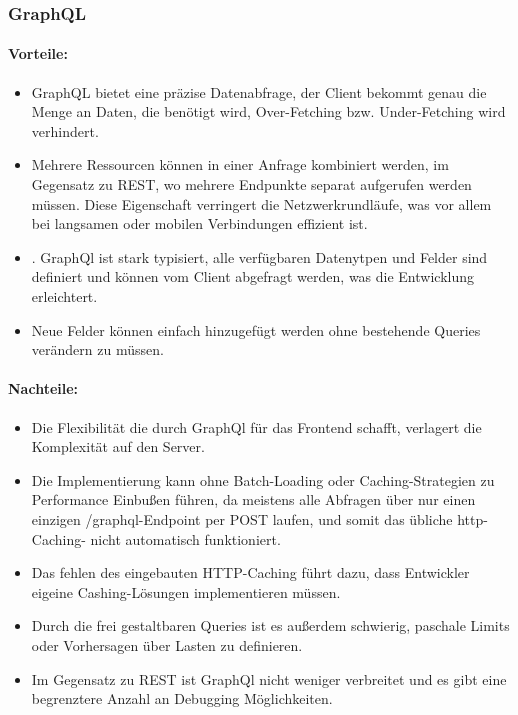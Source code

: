 \subsubsection{GraphQL}

\paragraph{Vorteile:}
\begin{itemize}
	\item GraphQL bietet eine präzise Datenabfrage, der Client bekommt genau die Menge an Daten, die benötigt wird, Over-Fetching bzw. Under-Fetching wird verhindert.
	\item Mehrere Ressourcen können in einer Anfrage kombiniert werden, im Gegensatz zu REST, wo mehrere Endpunkte separat aufgerufen werden müssen. Diese Eigenschaft verringert die Netzwerkrundläufe, was vor allem bei langsamen oder mobilen Verbindungen effizient ist.
	\item . GraphQl ist stark typisiert, alle verfügbaren Datenytpen und Felder sind definiert und können vom Client abgefragt werden, was die Entwicklung erleichtert. 
	\item Neue Felder können einfach hinzugefügt werden ohne bestehende Queries verändern zu müssen.
\end{itemize}

\paragraph{Nachteile:}
\begin{itemize}
	\item Die Flexibilität die durch GraphQl für das Frontend schafft, verlagert die Komplexität auf den Server. 
	\item Die Implementierung kann ohne Batch-Loading oder Caching-Strategien zu Performance Einbußen führen, da meistens alle Abfragen über nur einen einzigen /graphql-Endpoint per POST laufen, und somit das übliche http-Caching- nicht automatisch funktioniert. 
	\item Das fehlen des eingebauten HTTP-Caching führt dazu, dass Entwickler eigeine Cashing-Lösungen implementieren müssen. 
	\item Durch die frei gestaltbaren Queries ist es außerdem schwierig, paschale Limits oder Vorhersagen über Lasten zu definieren.
	\item Im Gegensatz zu REST ist GraphQl nicht weniger verbreitet und es gibt eine begrenztere Anzahl an Debugging Möglichkeiten.
\end{itemize}

